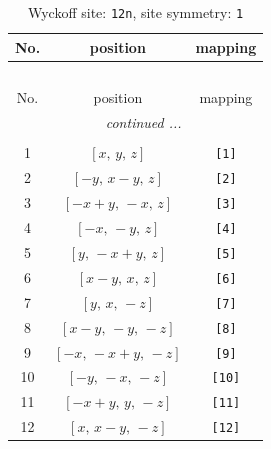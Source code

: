 \documentclass[fleqn,8pt]{jsarticle}
\begin{document}
\begin{longtable}{ccc}
\caption{Wyckoff site: {\tt 12n}, site symmetry: {\tt 1}}
 \\
 \hline \hline
No. & position & mapping \\ \hline \endfirsthead

\multicolumn{2}{l}{\tablename\ \thetable{}} \\
 \hline \hline
No. & position & mapping \\ \hline \endhead

 \hline \hline
\multicolumn{2}{r}{\footnotesize\it continued ...} \\ \endfoot

 \hline \hline
\multicolumn{2}{r}{} \\ \endlastfoot

1 & $\left[ x,\, y,\, z \right]$ & {\tt [1]} \\ \hline
2 & $\left[ - y,\, x - y,\, z \right]$ & {\tt [2]} \\ \hline
3 & $\left[ - x + y,\, - x,\, z \right]$ & {\tt [3]} \\ \hline
4 & $\left[ - x,\, - y,\, z \right]$ & {\tt [4]} \\ \hline
5 & $\left[ y,\, - x + y,\, z \right]$ & {\tt [5]} \\ \hline
6 & $\left[ x - y,\, x,\, z \right]$ & {\tt [6]} \\ \hline
7 & $\left[ y,\, x,\, - z \right]$ & {\tt [7]} \\ \hline
8 & $\left[ x - y,\, - y,\, - z \right]$ & {\tt [8]} \\ \hline
9 & $\left[ - x,\, - x + y,\, - z \right]$ & {\tt [9]} \\ \hline
10 & $\left[ - y,\, - x,\, - z \right]$ & {\tt [10]} \\ \hline
11 & $\left[ - x + y,\, y,\, - z \right]$ & {\tt [11]} \\ \hline
12 & $\left[ x,\, x - y,\, - z \right]$ & {\tt [12]} \\
\end{longtable}
\end{document}
